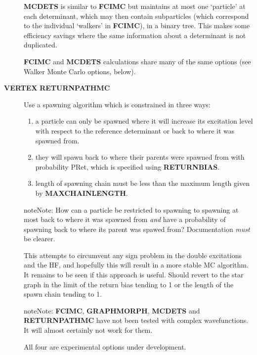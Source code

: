 \documentclass[openany,a4paper,10pt,english]{manual}
\begin{document}
\begin{description}
\textbf{MCDETS} is similar to \textbf{FCIMC} but maintains at most one
`particle' at each determinant, which may then contain subparticles
(which correspond to the individual `walkers' in \textbf{FCIMC}), in
a binary tree.  This makes some efficiency savings where the same
information about a determinant is not duplicated.

\textbf{FCIMC} and \textbf{MCDETS} calculations share many of the same options
(see Walker Monte Carlo options, below).

\item[\textbf{VERTEX} \textbf{RETURNPATHMC}] \leavevmode
Use a spawning algorithm which is constrained in three ways:
\begin{enumerate}
\item {} 
a particle can only be spawned where it will increase its
excitation level with respect to the reference determinant or
back to where it was spawned from.

\item {} 
they will spawn back to where their parents were spawned from
with probability PRet, which is specified using \textbf{RETURNBIAS}.

\item {} 
length of spawning chain must be less than the maximum length
given by \textbf{MAXCHAINLENGTH}.

\end{enumerate}

\begin{notice}{note}{Note:}
How can a particle be restricted to spawning to spawning at most
back to where it was spawned from \emph{and} have a probability of
spawning back to where its parent was spawed from?
Documentation \emph{must} be clearer.
\end{notice}

This attempts to circumvent any sign problem in the double
excitations and the HF, and hopefully this will result in a more stable
MC algorithm. It remains to be seen if this approach is useful.  Should
revert to the star graph in the limit of the return bias tending to 1 or
the length of the spawn chain tending to 1.

\begin{notice}{note}{Note:}
\textbf{FCIMC}, \textbf{GRAPHMORPH}, \textbf{MCDETS} and \textbf{RETURNPATHMC} have not
been tested with complex wavefunctions.  It will almost certainly
not work for them.

All four are experimental options under development.
\end{notice}

\end{description}
\end{document}
